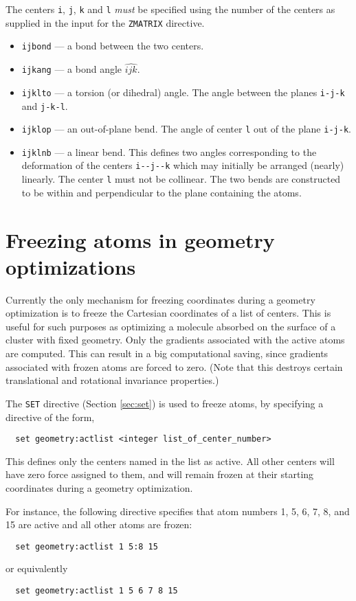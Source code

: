 The centers \verb+i+, \verb+j+, \verb+k+ and \verb+l+ {\em must}
be specified using the number of the centers as supplied in the input
for the \verb+ZMATRIX+ directive.  

\begin{itemize}
\item {\tt ijbond} --- a bond between the two centers.
\item {\tt ijkang} --- a bond angle $\widehat{ijk}$.
\item {\tt ijklto} --- a torsion (or dihedral) angle.  The
  angle between the planes \verb+i-j-k+ and \verb+j-k-l+.
\item {\tt ijklop} --- an out-of-plane bend.  The angle of center
  \verb+l+ out of the plane \verb+i-j-k+.
\item {\tt ijklnb} --- a linear bend.  This defines two angles
  corresponding to the deformation of the centers \verb+i--j--k+ 
  which may initially be arranged (nearly) linearly.  The center
  \verb+l+ must not be collinear.  The two bends are constructed to be
  within and perpendicular to the plane containing the atoms.
\end{itemize}   

\section{Freezing atoms in geometry optimizations}
\label{sec:activeatoms}

Currently the only mechanism for freezing coordinates during a
geometry optimization is to freeze the Cartesian coordinates of a list
of centers.  This is useful for such purposes as optimizing a molecule
absorbed on the surface of a cluster with fixed geometry.  Only the
gradients associated with the active atoms are computed.  This can
result in a big computational saving, since gradients associated with
frozen atoms are forced to zero.  (Note that this destroys certain
translational and rotational invariance properties.)

The \verb+SET+ directive (Section \ref{sec:set}) is used to freeze
atoms, by specifying a directive of the form,
\begin{verbatim}
  set geometry:actlist <integer list_of_center_number>
\end{verbatim}
This defines only the centers named in the list as active.  All
other 
centers will have zero force assigned to them, and will remain frozen
at their starting coordinates during a geometry optimization.

For instance, the following directive specifies that atom numbers 1,
5, 6, 7, 8, and 15 are active and all other atoms are frozen:
\begin{verbatim}
  set geometry:actlist 1 5:8 15
\end{verbatim}
or equivalently
\begin{verbatim}
  set geometry:actlist 1 5 6 7 8 15
\end{verbatim}


